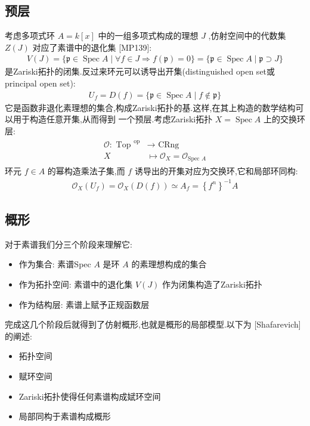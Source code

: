 \subsection{预层}
考虑多项式环 $A=k[x]$ 中的一组多项式构成的理想 $J$ ,仿射空间中的代数集 $Z(J)$ 对应了素谱中的退化集 [MP139]:
\begin{align*}
V(J)=\{\mathfrak{p} \in \operatorname{Spec} A \mid \forall f \in J \Rightarrow f(\mathfrak{p})=0\}=\{\mathfrak{p} \in \operatorname{Spec} A \mid \mathfrak{p} \supset J\}
\end{align*}
是Zariski拓扑的闭集.反过来环元可以诱导出开集(distinguished open set或principal open set):
\begin{align*}
U_f=D(f)=\{\mathfrak{p} \in \operatorname{Spec} A \mid f \notin \mathfrak{p}\}
\end{align*}
它是函数非退化素理想的集合,构成Zariski拓扑的基.这样,在其上构造的数学结构可以用于构造任意开集,从而得到 一个预层.考虑Zariski拓扑 $X=\operatorname{Spec} A$ 上的交换环层:
\begin{align*}
\begin{aligned}
\mathcal{O}: \text { Top }^{\mathrm{op}} & \rightarrow \text { CRng } \\
X & \mapsto \mathcal{O}_X=\mathcal{O}_{\text {Spec } A}
\end{aligned}
\end{align*}
环元 $f \in A$ 的幂构造乘法子集,而 $f$ 诱导出的开集对应为交换环,它和局部环同构:
\begin{align*}
\mathcal{O}_X\left(U_f\right)=\mathcal{O}_X(D(f)) \simeq A_f=\left\{f^n\right\}^{-1} A
\end{align*}
\subsection{概形}
对于素谱我们分三个阶段来理解它:
\begin{itemize}
  \item 作为集合: 素谱Spec $A$ 是环 $A$ 的素理想构成的集合
  \item 作为拓扑空间: 素谱中的退化集 $V(J)$ 作为闭集构造了Zariski拓扑
  \item 作为结构层: 素谱上赋予正规函数层
\end{itemize}

完成这几个阶段后就得到了仿射概形,也就是概形的局部模型.以下为 [Shafarevich] 的阐述:
\begin{itemize}
  \item 拓扑空间
  \item 赋环空间
  \item Zariski拓扑使得任何素谱构成娬环空间
  \item 局部同构于素谱构成概形
\end{itemize}

